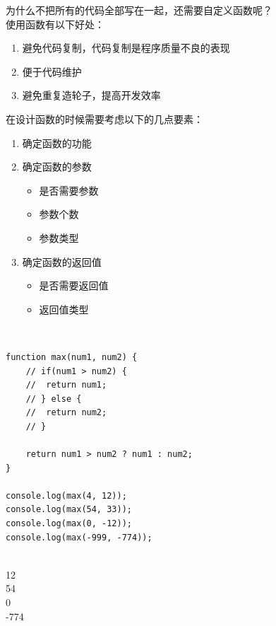 为什么不把所有的代码全部写在一起，还需要自定义函数呢？ \\

使用函数有以下好处：

\begin{enumerate}
	\item 避免代码复制，代码复制是程序质量不良的表现
	\item 便于代码维护
	\item 避免重复造轮子，提高开发效率
\end{enumerate}

在设计函数的时候需要考虑以下的几点要素：

\begin{enumerate}
	\item 确定函数的功能

	\item 确定函数的参数
	      \begin{itemize}
		      \item 是否需要参数
		      \item 参数个数
		      \item 参数类型
	      \end{itemize}

	\item 确定函数的返回值
	      \begin{itemize}
		      \item 是否需要返回值
		      \item 返回值类型
	      \end{itemize}
\end{enumerate}

 \\

\begin{lstlisting}[style=htmlcssjs]
function max(num1, num2) {
    // if(num1 > num2) {
    //  return num1;
    // } else {
    //  return num2;
    // }

    return num1 > num2 ? num1 : num2;
}

console.log(max(4, 12));
console.log(max(54, 33));
console.log(max(0, -12));
console.log(max(-999, -774));
\end{lstlisting}

\begin{tcolorbox}
	 \\
	12 \\
	54 \\
	0 \\
	-774
\end{tcolorbox}

